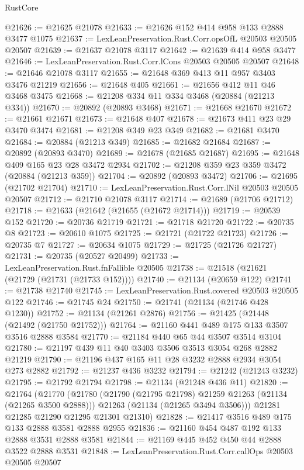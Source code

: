 \begin{lexlean}{RustCore}
\begin{coremodule}
@21626 := @21625 @21078
@21633 := @21626 @152 @414 @958 @133 @2888 @3477 @1075
@21637 := LexLeanPreservation.Rust.Corr.opsOfL @20503 @20505 @20507
@21639 := @21637 @21078 @3117
@21642 := @21639 @414 @958 @3477
@21646 := LexLeanPreservation.Rust.Corr.lCons @20503 @20505 @20507
@21648 := @21646 @21078 @3117
@21655 := @21648 @369 @413 @11 @957 @3403 @3476 @21219
@21656 := @21648 @405
@21661 := @21656 @412 @11 @46 @3468 @3475
@21668 := @21208 @334 @11 @334 @3468 (@20884 (@21213 @334))
@21670 := @20892 (@20893 @3468)
@21671 := @21668 @21670
@21672 := @21661 @21671
@21673 := @21648 @407
@21678 := @21673 @411 @23 @29 @3470 @3474
@21681 := @21208 @349 @23 @349
@21682 := @21681 @3470
@21684 := @20884 (@21213 @349)
@21685 := @21682 @21684
@21687 := @20892 (@20893 @3470)
@21689 := @21678 (@21685 @21687)
@21695 := @21648 @409 @165 @23 @28 @3472 @2934
@21702 := @21208 @359 @23 @359 @3472 (@20884 (@21213 @359))
@21704 := @20892 (@20893 @3472)
@21706 := @21695 (@21702 @21704)
@21710 := LexLeanPreservation.Rust.Corr.lNil @20503 @20505 @20507
@21712 := @21710 @21078 @3117
@21714 := @21689 (@21706 @21712)
@21718 := @21633 (@21642 (@21655 (@21672 @21714)))
@21719 := @20539 @152
@21720 := @20736 @21719
@21721 := @21718 @21720
@21722 := @20735 @8
@21723 := @20610 @1075
@21725 := @21721 (@21722 @21723)
@21726 := @20735 @7
@21727 := @20634 @1075
@21729 := @21725 (@21726 @21727)
@21731 := @20735 (@20527 @20499)
@21733 := LexLeanPreservation.Rust.fnFallible @20505
@21738 := @21518 (@21621 (@21729 (@21731 (@21733 @152))))
@21740 := @21134 (@20659 @122)
@21741 := @21738 @21740
@21745 := LexLeanPreservation.Rust.covered @20503 @20505 @122
@21746 := @21745 @24
@21750 := @21741 (@21134 (@21746 @428 @1230))
@21752 := @21134 (@21261 @2876)
@21756 := @21425 (@21448 (@21492 (@21750 @21752)))
@21764 := @21160 @441 @489 @175 @133 @3507 @3516 @2888 @3584
@21770 := @21184 @440 @65 @44 @3507 @3514 @3104
@21780 := @21197 @439 @11 @40 @3403 @3506 @3513 @3054 @268 @2882 @21219
@21790 := @21196 @437 @165 @11 @28 @3232 @2888 @2934 @3054 @273 @2882
@21792 := @21237 @436 @3232
@21794 := @21242 (@21243 @3232)
@21795 := @21792 @21794
@21798 := @21134 (@21248 @436 @11)
@21820 := @21764
    (@21770
      (@21780
        (@21790 (@21795 @21798) @21259 @21263 (@21134 (@21265 @3500 @2888)))
        @21263
        (@21134 (@21265 @3494 @3506)))
      @21281
      @21285
      @21290
      @21295
      @21301
      @21310)
@21828 := @21417 @3516 @489 @175 @133 @2888 @3581 @2888 @2955
@21836 := @21160 @454 @487 @192 @133 @2888 @3531 @2888 @3581
@21844 := @21169 @445 @452 @450 @44 @2888 @3522 @2888 @3531
@21848 := LexLeanPreservation.Rust.Corr.callOps @20503 @20505 @20507

\end{coremodule}
\end{lexlean}
